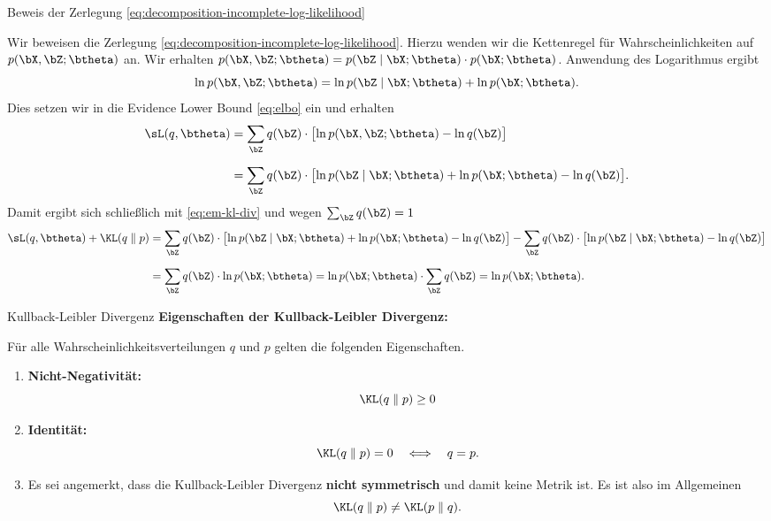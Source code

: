 \begin{frame}{Beweis der Zerlegung \eqref{eq:decomposition-incomplete-log-likelihood}}{}
	\begin{myproof}
		Wir beweisen die Zerlegung \eqref{eq:decomposition-incomplete-log-likelihood}.
		Hierzu wenden wir die Kettenregel für Wahrscheinlichkeiten auf $p(\bX, \bZ; \btheta)$ an.
		Wir erhalten $p(\bX, \bZ; \btheta) = p(\bZ \mid \bX; \btheta) \cdot p(\bX; \btheta)$.
		Anwendung des Logarithmus ergibt $$\ln p(\bX, \bZ; \btheta) = \ln p(\bZ \mid \bX; \btheta) + \ln p(\bX; \btheta).$$
		Dies setzen wir in die Evidence Lower Bound \eqref{eq:elbo} ein und erhalten
		\begin{align*}
			\sL(q, \btheta)
				&= \sum_{\bZ} q(\bZ) \cdot \bigl[ \ln p(\bX, \bZ; \btheta) - \ln q(\bZ) \bigr]
		\\[2mm]
				&= \sum_{\bZ} q(\bZ) \cdot \bigl[ \ln p(\bZ \mid \bX; \btheta) + \ln p(\bX; \btheta) - \ln q(\bZ) \bigr].
		\end{align*}
		Damit ergibt sich schließlich mit \eqref{eq:em-kl-div} und wegen $\sum_{\bZ} q(\bZ) = 1$
		\begin{align*}
			\sL(q, \btheta) + \KL(q \parallel p)
				&= \sum_{\bZ} q(\bZ) \cdot \bigl[ \ln p(\bZ \mid \bX; \btheta) + \ln p(\bX; \btheta) - \ln q(\bZ) \bigr]
					- \sum_{\bZ} q(\bZ) \cdot \bigl[ \ln p(\bZ \mid \bX; \btheta) - \ln q(\bZ) \bigr]
		\\[2mm]
				&= \sum_{\bZ} q(\bZ) \cdot \ln p(\bX; \btheta) = \ln p(\bX; \btheta) \cdot \sum_{\bZ} q(\bZ) = \ln p(\bX; \btheta).
		\end{align*}
	\end{myproof}
\end{frame}


\begin{frame}{Kullback-Leibler Divergenz}{}
	\textbf{Eigenschaften der Kullback-Leibler Divergenz:}

	\begin{boxGray}
		Für alle Wahrscheinlichkeitsverteilungen $q$ und $p$ gelten die folgenden Eigenschaften.

		\begin{enumerate}
			\item \textbf{Nicht-Negativität:}
			\begin{equation} \label{eq:kl-non-neg}
				\KL(q \parallel p) \ge 0
			\end{equation}
			\item \textbf{Identität:}
			\begin{equation} \label{eq:kl-ident}
				\KL(q \parallel p) = 0 \quad\Longleftrightarrow\quad q = p.
			\end{equation}
			\item Es sei angemerkt, dass die Kullback-Leibler Divergenz \textbf{nicht symmetrisch} und damit keine Metrik ist. Es ist also im Allgemeinen
				$$\KL(q \parallel p) \ne \KL(p \parallel q).$$
		\end{enumerate}
	\end{boxGray}
\end{frame}


